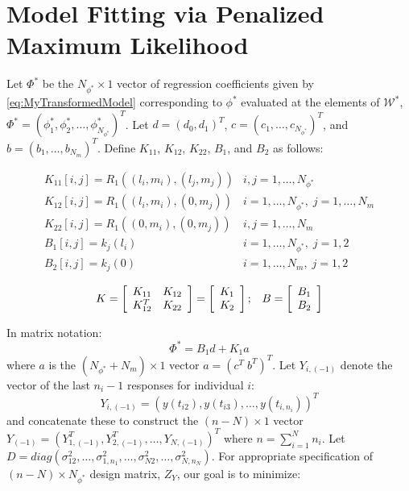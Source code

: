 \section{Model Fitting via Penalized Maximum Likelihood}



Let $\Phi^*$ be the $N_{\phi^*} \times 1$ vector of regression coefficients given by \eqref{eq:MyTransformedModel} corresponding to $\phi^*$ evaluated at the elements of $\mathcal{W}^*$, $\Phi^* = \left(\phi^*_1,\phi^*_2, \dots, \phi^*_{N_{\phi^*}}  \right)^T$. Let $d = \left(d_0, d_1\right)^T$, $c = \left(c_1, \dots, c_{N_{\phi^*}}  \right)^T$, and $b = \left(b_1, \dots, b_{N_m}  \right)^T$.   Define $K_{11}$, $K_{12}$, $K_{22}$, $B_{1}$, and $B_2$ as follows: 

\[
\begin{array}{ll}
{K_{11}}\left[i,j\right] = R_1\left(\left(l_i,m_i\right),\left(l_j,m_j\right)\right) &  i,j = 1, \dots, N_{\phi^*}\\
{K_{12}}\left[i,j\right] = R_1\left(\left(l_i,m_i\right),\left(0,m_j\right)\right) &  i = 1, \dots, N_{\phi^*},\;j = 1, \dots, N_m \\
{K_{22}}\left[i,j\right] = R_1\left(\left(0,m_i\right),\left(0,m_j\right)\right) &  i,j = 1, \dots, N_m\\
B_1\left[i , j\right] = k_j\left(l_i\right) &  i = 1, \dots, N_{\phi^*},\;j = 1, 2\\
B_2\left[i , j\right] = k_j\left(0\right) &  i = 1, \dots, N_m,\;j = 1, 2\\
\end{array}
\]
\[
K = \left[\begin{array}{cc}
		K_{11} & K_{12}\\
		K_{12}^T & K_{22}
		\end{array}\right] = \left[\begin{array}{c}
		K_1\\
		K_2
		\end{array}\right]\\;\;\;\; B = \left[ \begin{array}{c}B_1\\
										       B_2\end{array}\right] \]


\noindent
In matrix notation:
\[
\Phi^* = B_1 d + K_1a							
\]
\noindent
where $a$ is the $\left( N_{\phi^*}+ N_m \right) \times 1$ vector $a = \left(c^T \; b^T  \right)^T$. Let $Y_{i,\left(-1\right)}$ denote the vector of the last $n_i - 1$ responses for individual $i$: 
\[
Y_{i,\left(-1\right)} = \left(y\left(t_{i2}\right), y\left(t_{i3}\right), \dots, y\left(t_{i,n_i}\right)\right)^T
\]
\noindent
and concatenate these to construct the $\left(n-N\right)\times 1$ vector $Y_{\left(-1\right)} = \left( Y_{1,\left(-1\right)}^T, Y_{2,\left(-1\right)}^T, \dots, Y_{N,\left(-1\right)} \right)^T$ where $n = \sum_{i=1}^N n_i$. Let $D = diag\left(\sigma^2_{12},\dots,\sigma^2_{1,n_1},\dots,\sigma^2_{N2},\dots,\sigma^2_{N,n_N}\right)$. For appropriate specification of $\left(n-N\right) \times N_{\phi^*}$ design matrix, $Z_Y$, our goal is to minimize:


